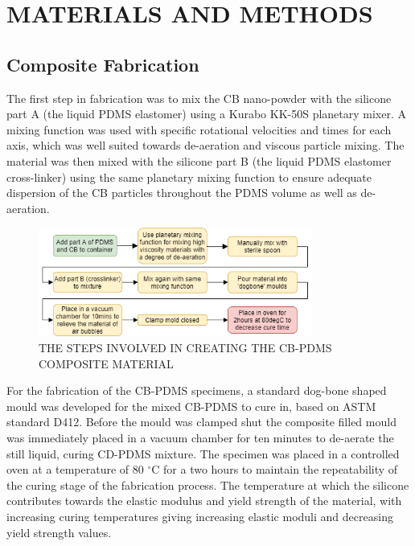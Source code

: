 \section*{MATERIALS AND METHODS}


\subsection*{Composite Fabrication}
The first step in fabrication was to mix the CB nano-powder with the silicone part A (the liquid PDMS elastomer) using a Kurabo KK-50S planetary mixer. A mixing function was used with specific rotational velocities and times for each axis, which was well suited towards de-aeration and viscous particle mixing. The material was then mixed with the silicone part B (the liquid PDMS elastomer cross-linker) using the same planetary mixing function to ensure adequate dispersion of the CB particles throughout the PDMS volume as well as de-aeration.
\begin{figure}[H]
    \centering
    \includegraphics[width=9cm]{Figures/specimenPrepFlowDiagram (1).png}
    \caption{THE STEPS INVOLVED IN CREATING THE CB-PDMS COMPOSITE MATERIAL}
    \label{fig:CB-PDMS_flow_diagram}
\end{figure}
For the fabrication of the CB-PDMS specimens, a standard dog-bone shaped mould was developed for the mixed CB-PDMS to cure in, based on ASTM standard D412\cite{ASTM2020}. Before the mould was clamped shut the composite filled mould was immediately placed in a vacuum chamber for ten minutes to de-aerate the still liquid, curing CD-PDMS mixture. The specimen was placed in a controlled oven at a temperature of 80 $^{\circ}$C for a two hours to maintain the repeatability of the curing stage of the fabrication process. The temperature at which the silicone contributes towards the elastic modulus and yield strength of the material, with increasing curing temperatures giving increasing elastic moduli and decreasing yield strength values.



